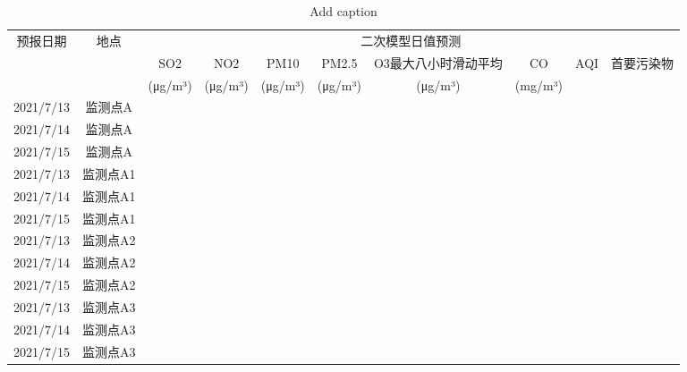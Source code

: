 \documentclass[a4paper,10pt]{my_paper}
\numberwithin{equation}{section}
\begin{document}
\begin{table}[htbp]
  \centering
  \caption{Add caption}
    \begin{tabular}{ccrrrrrrrr}
    \toprule
    \multirow{3}[2]{*}{预报日期} & \multirow{3}[2]{*}{地点} & \multicolumn{8}{c}{二次模型日值预测} \\
          &       & \multicolumn{1}{c}{SO2 } & \multicolumn{1}{c}{NO2 } & \multicolumn{1}{c}{PM10 } & \multicolumn{1}{c}{PM2.5 } & \multicolumn{1}{c}{O3最大八小时滑动平均} & \multicolumn{1}{c}{CO} & \multicolumn{1}{c}{\multirow{2}[1]{*}{AQI}} & \multicolumn{1}{c}{\multirow{2}[1]{*}{首要污染物}} \\
          &       & \multicolumn{1}{c}{(μg/m³)} & \multicolumn{1}{c}{(μg/m³)} & \multicolumn{1}{c}{(μg/m³)} & \multicolumn{1}{c}{(μg/m³)} & \multicolumn{1}{c}{ (μg/m³)} & \multicolumn{1}{c}{ (mg/m³)} &       &  \\
    \midrule
    2021/7/13 & 监测点A  &       &       &       &       &       &       &       &  \\
    2021/7/14 & 监测点A  &       &       &       &       &       &       &       &  \\
    2021/7/15 & 监测点A  &       &       &       &       &       &       &       &  \\
    2021/7/13 & 监测点A1 &       &       &       &       &       &       &       &  \\
    2021/7/14 & 监测点A1 &       &       &       &       &       &       &       &  \\
    2021/7/15 & 监测点A1 &       &       &       &       &       &       &       &  \\
    2021/7/13 & 监测点A2 &       &       &       &       &       &       &       &  \\
    2021/7/14 & 监测点A2 &       &       &       &       &       &       &       &  \\
    2021/7/15 & 监测点A2 &       &       &       &       &       &       &       &  \\
    2021/7/13 & 监测点A3 &       &       &       &       &       &       &       &  \\
    2021/7/14 & 监测点A3 &       &       &       &       &       &       &       &  \\
    2021/7/15 & 监测点A3 &       &       &       &       &       &       &       &  \\
    \bottomrule
    \end{tabular}%
  \label{tab:addlabel}%
\end{table}%
\end{document}
